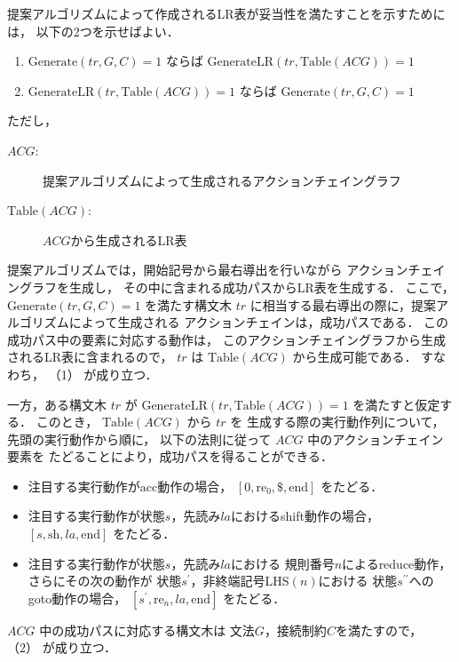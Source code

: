 \documentclass[japanese]{jnlp_1.4}
\begin{document}
提案アルゴリズムによって作成されるLR表が妥当性を満たすことを示すためには，
以下の2つを示せばよい．
\begin{enumerate}
\item $\mathrm{Generate}(\mathit{tr}, G, C) = 1$ ならば $\mathrm{GenerateLR}(\mathit{tr}, \mathrm{Table}(\mathit{ACG})) = 1$
\item $\mathrm{GenerateLR}(\mathit{tr}, \mathrm{Table}(\mathit{ACG})) = 1$ ならば $\mathrm{Generate}(\mathit{tr}, G, C) = 1$
\end{enumerate}
ただし，
\begin{description}
\item[$\mathit{ACG}$:]
  提案アルゴリズムによって生成されるアクションチェイングラフ
\item[$\mathrm{Table}(\mathit{ACG})$:] $\mathit{ACG}$から生成されるLR表
\end{description}

提案アルゴリズムでは，開始記号から最右導出を行いながら
アクションチェイングラフを生成し，
その中に含まれる成功パスからLR表を生成する．
ここで，$\mathrm{Generate}(\mathit{tr}, G, C) = 1$ を満たす構文木
$\mathit{tr}$ に相当する最右導出の際に，提案アルゴリズムによって生成される
アクションチェインは，成功パスである．
この成功パス中の要素に対応する動作は，
このアクションチェイングラフから生成されるLR表に含まれるので，
$\mathit{tr}$ は $\mathrm{Table}(\mathit{ACG})$ から生成可能である．
すなわち，
（1）
が成り立つ．

一方，ある構文木 $\mathit{tr}$ が
$\mathrm{GenerateLR}(\mathit{tr}, \mathrm{Table}(\mathit{ACG})) = 1$
を満たすと仮定する．
このとき， $\mathrm{Table}(\mathit{ACG})$ から $\mathit{tr}$ を
生成する際の実行動作列について，先頭の実行動作から順に，
以下の法則に従って $\mathit{ACG}$ 中のアクションチェイン要素を
たどることにより，成功パスを得ることができる．
\begin{itemize}
\item 注目する実行動作がacc動作の場合， $[0,\mathrm{re}_0,\$,\mathrm{end}]$ をたどる．
\item 注目する実行動作が状態$s$，先読み$\mathit{la}$におけるshift動作の場合，
  $[s,\mathrm{sh},\mathit{la},\mathrm{end}]$ をたどる．
\item 注目する実行動作が状態$s$，先読み$\mathit{la}$における
  規則番号$n$によるreduce動作，さらにその次の動作が
  状態$s^\prime$，非終端記号$\mathrm{LHS}(n)$における
  状態$s^{\prime\prime}$へのgoto動作の場合，
  $[s^\prime,\mathrm{re}_n,\mathit{la},\mathrm{end}]$ をたどる．
\end{itemize}
$\mathit{ACG}$ 中の成功パスに対応する構文木は
文法$G$，接続制約$C$を満たすので，
（2）
が成り立つ．
\end{document}
